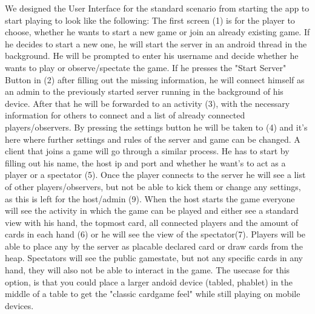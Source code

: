 \documentclass{report}
\begin{document}
We designed the User Interface for the standard scenario from starting the app to start playing to look like the following: The first screen (1) is for the player to choose, whether he wants to start a new game or join an already existing game. If he decides to start a new one, he will start the server in an android thread in the background. He will be prompted to enter his username and decide whether he wants to play or observe/spectate the game. If he presses the "Start Server" Button in (2) after filling out the missing information, he will connect himself as an admin to the previously started server running in the background of his device. After that he will be forwarded to an activity (3), with the necessary information for others to connect and a list of already connected players/observers. By pressing the settings button he will be taken to (4) and it's here where further settings and rules of the server and game can be changed. A client that joins a game will go through a similar process. He has to start by filling out his name, the host ip and port and whether he want's to act as a player or a spectator (5). Once the player connects to the server he will see a list of other players/observers, but not be able to kick them or change any settings, as this is left for the host/admin (9). When the host starts the game everyone will see the activity in which the game can be played and either see a standard view with his hand, the topmost card, all connected players and the amount of cards in each hand (6) or he will see the view of the spectator(7). Players will be able to place any by the server as placable declared card or draw cards from the heap. Spectators will see the public gamestate, but not any specific cards in any hand, they will also not be able to interact in the game. The usecase for this option, is that you could place a larger andoid device (tabled, phablet) in the middle of a table to get the "classic cardgame feel" while still playing on mobile devices. \\
\end{document}
